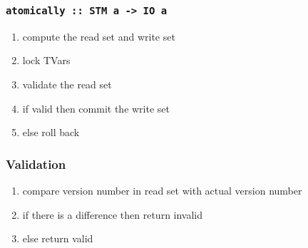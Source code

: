 \documentclass{beamer}
\begin{document}
%   
  \begin{frame}
   \frametitle{\lstinline{atomically :: STM a -> IO a}}
   \begin{enumerate}\setlength\itemsep{1em}
    \item compute the read set and write set
    \item lock TVars
    \item validate the read set
    \item if valid then commit the write set
    \item else roll back
   \end{enumerate}
  \end{frame}

  \begin{frame}
   \frametitle{Validation}
    \begin{enumerate}\setlength\itemsep{1em}
      \item compare version number in read set with actual version number
      \item if there is a difference then return invalid 
      \item else return valid
    \end{enumerate}
  \end{frame}

\end{document}
